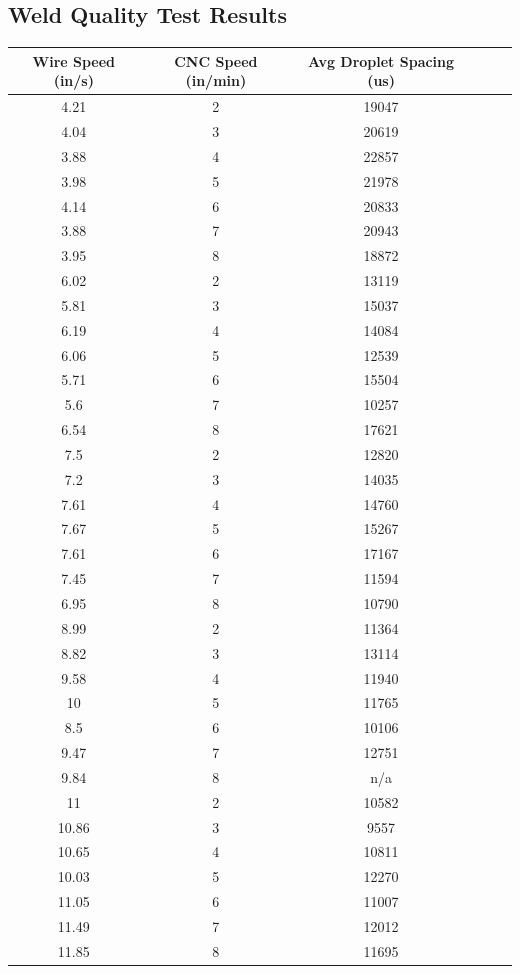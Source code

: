\documentclass[12pt]{article}
\begin{document}




\clearpage


\subsection{Weld Quality Test Results}

\begin{center}


\begin{tabular}{ |c|c|c|c|c|c| }


  \hline
  \textbf{Wire Speed (in/s)} & \textbf{CNC Speed (in/min)} & \textbf{Avg Droplet Spacing (us)} \\ \hline
4.21	& 2 &	19047 \\ \hline
4.04 &	3 &	20619 \\ \hline
3.88 &	4 &	22857 \\ \hline
3.98 &	5 &	21978 \\ \hline
4.14 &	6 &	20833 \\ \hline 
3.88 &	7 &	20943 \\ \hline
3.95 &	8 &	18872 \\ \hline \hline
6.02 &	2 &	13119 \\ \hline
5.81 &	3 &	15037 \\ \hline
6.19 &	4 &	14084 \\ \hline
6.06 &	5 &	12539 \\ \hline
5.71 &	6 &	15504 \\ \hline
5.6 &	7 &	10257 \\ \hline
6.54 &	8 &	17621 \\ \hline \hline
7.5	 & 2 &	12820 \\ \hline
7.2 &	3 &	14035 \\ \hline
7.61 &	4 &	14760 \\ \hline
7.67 &	5 &	15267 \\ \hline
7.61 &	6 &	17167 \\ \hline
7.45 &	7 &	11594 \\ \hline
6.95 &	8 &	10790 \\ \hline \hline
8.99 &	2 &	11364 \\ \hline 
8.82 &	3 &	13114 \\ \hline
9.58 &	4 &	11940 \\ \hline
10 &	5 &	11765 \\ \hline
8.5 &	6 &	10106 \\ \hline
9.47 &	7 &	12751 \\ \hline
9.84 &	8 &	n/a \\ \hline \hline
11 &	2 &	10582 \\ \hline
10.86 &	3 &	9557 \\ \hline
10.65 &	4 &	10811 \\ \hline
10.03 &	5 &	12270 \\ \hline
11.05 &	6 &	11007 \\ \hline
11.49 &	7 &	12012 \\ \hline
11.85 &	8 &	11695 \\ \hline




\end{tabular}
\end{center}
\end{document}
